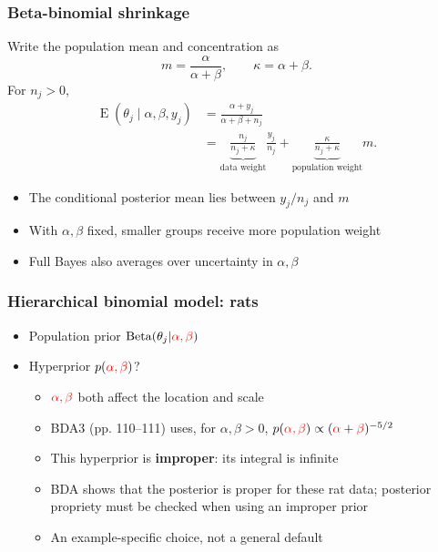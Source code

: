 \documentclass[10pt]{beamer}
\begin{document}
\begin{frame}
\frametitle{Beta-binomial shrinkage}

  Write the population mean and concentration as
  \[
    m=\frac{\alpha}{\alpha+\beta},\qquad
    \kappa=\alpha+\beta.
  \]
  For $n_j>0$,
  \begin{align*}
    \operatorname{E}(\theta_j\mid\alpha,\beta,y_j)
      &=\frac{\alpha+y_j}{\alpha+\beta+n_j}\\
      &=\underbrace{\frac{n_j}{n_j+\kappa}}_{\text{data weight}}
        \frac{y_j}{n_j}
        +\underbrace{\frac{\kappa}{n_j+\kappa}}_{\text{population weight}}m.
  \end{align*}
  \begin{itemize}
  \item The conditional posterior mean lies between $y_j/n_j$ and $m$
  \item With $\alpha,\beta$ fixed, smaller groups receive more
    population weight
  \item Full Bayes also averages over uncertainty in $\alpha,\beta$
  \end{itemize}
\end{frame}

\begin{frame}

\frametitle{Hierarchical binomial model: rats}

  \begin{itemize}
  \item Population prior $\operatorname{Beta}(\theta_j|{\color{red}\alpha,\beta})$
  \item Hyperprior $p({\color{red}\alpha,\beta})$?
    \begin{itemize}
    \item ${\color{red}\alpha,\beta}$ both affect the location and scale
    \item BDA3 (pp. 110--111) uses, for $\alpha,\beta>0$,
      $p({\color{red}\alpha,\beta})\propto({\color{red}\alpha}+{\color{red}\beta})^{-5/2}$
    \item This hyperprior is \textbf{improper}: its integral is infinite
    \item BDA shows that the posterior is proper for these rat data;
      posterior propriety must be checked when using an improper prior
    \item An example-specific choice, not a general default
    \end{itemize}
    \end{itemize}
\end{frame}
\end{document}
